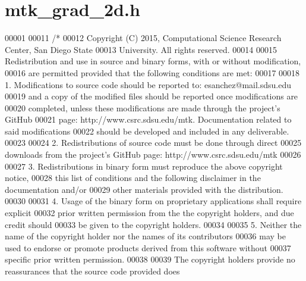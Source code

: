 \hypertarget{mtk__grad__2d_8h_source}{\section{mtk\+\_\+grad\+\_\+2d.\+h}
\label{mtk__grad__2d_8h_source}
}

\begin{DoxyCode}
00001 
00011 \textcolor{comment}{/*}
00012 \textcolor{comment}{Copyright (C) 2015, Computational Science Research Center, San Diego State}
00013 \textcolor{comment}{University. All rights reserved.}
00014 \textcolor{comment}{}
00015 \textcolor{comment}{Redistribution and use in source and binary forms, with or without modification,}
00016 \textcolor{comment}{are permitted provided that the following conditions are met:}
00017 \textcolor{comment}{}
00018 \textcolor{comment}{1. Modifications to source code should be reported to: esanchez@mail.sdsu.edu}
00019 \textcolor{comment}{and a copy of the modified files should be reported once modifications are}
00020 \textcolor{comment}{completed, unless these modifications are made through the project's GitHub}
00021 \textcolor{comment}{page: http://www.csrc.sdsu.edu/mtk. Documentation related to said modifications}
00022 \textcolor{comment}{should be developed and included in any deliverable.}
00023 \textcolor{comment}{}
00024 \textcolor{comment}{2. Redistributions of source code must be done through direct}
00025 \textcolor{comment}{downloads from the project's GitHub page: http://www.csrc.sdsu.edu/mtk}
00026 \textcolor{comment}{}
00027 \textcolor{comment}{3. Redistributions in binary form must reproduce the above copyright notice,}
00028 \textcolor{comment}{this list of conditions and the following disclaimer in the documentation and/or}
00029 \textcolor{comment}{other materials provided with the distribution.}
00030 \textcolor{comment}{}
00031 \textcolor{comment}{4. Usage of the binary form on proprietary applications shall require explicit}
00032 \textcolor{comment}{prior written permission from the the copyright holders, and due credit should}
00033 \textcolor{comment}{be given to the copyright holders.}
00034 \textcolor{comment}{}
00035 \textcolor{comment}{5. Neither the name of the copyright holder nor the names of its contributors}
00036 \textcolor{comment}{may be used to endorse or promote products derived from this software without}
00037 \textcolor{comment}{specific prior written permission.}
00038 \textcolor{comment}{}
00039 \textcolor{comment}{The copyright holders provide no reassurances that the source code provided does}

\end{DoxyCode}
